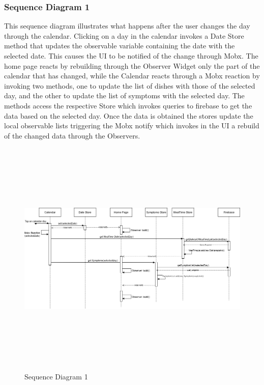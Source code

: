 \documentclass [12pt]{article}
\begin{document}
\subsubsection{Sequence Diagram 1}
This sequence diagram illustrates what happens after the user changes the day through the calendar.
Clicking on a day in the calendar invokes a Date Store method that updates the observable variable containing the date with the selected date. This causes the UI to be notified of the change through Mobx. The home page reacts by rebuilding through the Observer Widget only the part of the calendar that has changed, while the Calendar reacts through a Mobx reaction by invoking two methods, one to update the list of dishes with those of the selected day, and the other to update the list of symptoms with the selected day.
The methods access the respective Store which invokes queries to firebase to get the data based on the selected day. Once the data is obtained the stores update the local observable lists triggering the Mobx notify which invokes in the UI a rebuild of the changed data through the Observers.

\begin{figure}[ht!]
\centering
\includegraphics[height=11.5cm, width=\linewidth]{SequenceCalendarClick.png}
\caption{Sequence Diagram 1}
\end{figure}  
\clearpage
\end{document}
